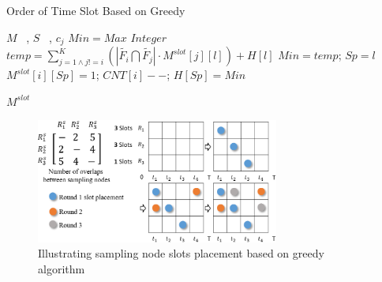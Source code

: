 \documentclass[conference,compsoc]{IEEEtran}
\begin{document}
\begin{algorithm}[h]
\caption{Order of Time Slot Based on Greedy}
\begin{algorithmic}[1]
\REQUIRE  $M$ ~, $S$ ~, $c_j$
\STATE $Min = Max$ $Integer$
\STATE $temp = \sum^{K}_{j=1 \wedge j != i}(\left| \widetilde{{{F}_{i}}}\bigcap \widetilde{{{F}_{j}}} \right| \cdot M^{slot}[j][l]) + H[l] $
\STATE $Min = temp$; $Sp = l$ 
\ENDIF
\ENDIF
\ENDFOR
\STATE$M^{slot}[i][Sp] = 1$; $ CNT[i]--$; $H[Sp] = Min$
\ENDIF
\ENDFOR
\ENDWHILE

\RETURN $M^{slot}$
\label{code:recentEnd}
\end{algorithmic}
\end{algorithm}

\begin{figure}[!hhhhhhhhhht]
\centering
\includegraphics[width=8cm]{images/greedy_for_order_slot.png}
\caption{Illustrating sampling node slots placement based on greedy algorithm}
\label{slot_order}
\end{figure}
\end{document}
